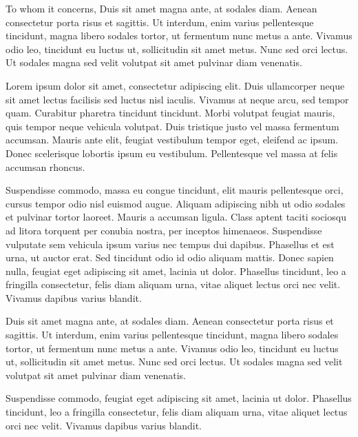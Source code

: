 \documentclass[]{SBResume}
\begin{document}
\makeheader
\makelettertitle

\begin{letterbody}{To whom it concerns,}
  Duis sit amet magna ante, at sodales diam. Aenean consectetur porta risus et sagittis. Ut interdum, enim varius pellentesque tincidunt, magna libero sodales tortor, ut fermentum nunc metus a ante. Vivamus odio leo, tincidunt eu luctus ut, sollicitudin sit amet metus. Nunc sed orci lectus. Ut sodales magna sed velit volutpat sit amet pulvinar diam venenatis.


  Lorem ipsum dolor sit amet, consectetur adipiscing elit. Duis ullamcorper neque sit amet lectus facilisis sed luctus nisl iaculis. Vivamus at neque arcu, sed tempor quam. Curabitur pharetra tincidunt tincidunt. Morbi volutpat feugiat mauris, quis tempor neque vehicula volutpat. Duis tristique justo vel massa fermentum accumsan. Mauris ante elit, feugiat vestibulum tempor eget, eleifend ac ipsum. Donec scelerisque lobortis ipsum eu vestibulum. Pellentesque vel massa at felis accumsan rhoncus.


  Suspendisse commodo, massa eu congue tincidunt, elit mauris pellentesque orci, cursus tempor odio nisl euismod augue. Aliquam adipiscing nibh ut odio sodales et pulvinar tortor laoreet. Mauris a accumsan ligula. Class aptent taciti sociosqu ad litora torquent per conubia nostra, per inceptos himenaeos. Suspendisse vulputate sem vehicula ipsum varius nec tempus dui dapibus. Phasellus et est urna, ut auctor erat. Sed tincidunt odio id odio aliquam mattis. Donec sapien nulla, feugiat eget adipiscing sit amet, lacinia ut dolor. Phasellus tincidunt, leo a fringilla consectetur, felis diam aliquam urna, vitae aliquet lectus orci nec velit. Vivamus dapibus varius blandit.


  Duis sit amet magna ante, at sodales diam. Aenean consectetur porta risus et sagittis. Ut interdum, enim varius pellentesque tincidunt, magna libero sodales tortor, ut fermentum nunc metus a ante. Vivamus odio leo, tincidunt eu luctus ut, sollicitudin sit amet metus. Nunc sed orci lectus. Ut sodales magna sed velit volutpat sit amet pulvinar diam venenatis.

  Suspendisse commodo, feugiat eget adipiscing sit amet, lacinia ut dolor. Phasellus tincidunt, leo a fringilla consectetur, felis diam aliquam urna, vitae aliquet lectus orci nec velit. Vivamus dapibus varius blandit.

\end{letterbody}




\end{document}
